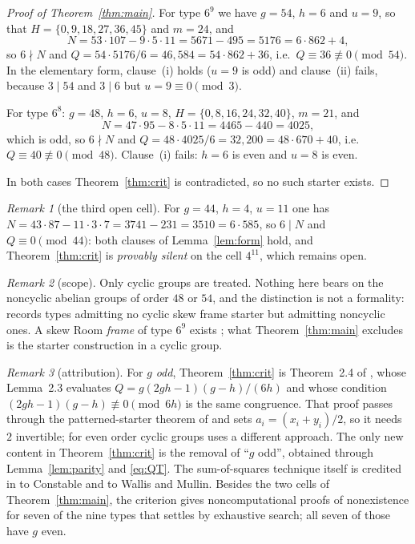\documentclass[11pt]{amsart}
\theoremstyle{remark}
\newtheorem*{remark}{Remark}
\begin{document}
\begin{proof}[Proof of Theorem~\ref{thm:main}]
For type $6^{9}$ we have $g=54$, $h=6$ and $u=9$, so that
$H=\{0,9,18,27,36,45\}$ and $m=24$, and
\[
  N=53\cdot107-9\cdot5\cdot11=5671-495=5176=6\cdot862+4,
\]
so $6\nmid N$ and $Q=54\cdot5176/6=46{,}584=54\cdot862+36$, i.e.\
$Q\equiv36\not\equiv0\pmod{54}$. In the elementary form, clause~(i) holds
($u=9$ is odd) and clause~(ii) fails, because $3\mid54$ and $3\mid 6$ but
$u=9\equiv0\pmod3$.

For type $6^{8}$: $g=48$, $h=6$, $u=8$, $H=\{0,8,16,24,32,40\}$, $m=21$, and
\[
  N=47\cdot95-8\cdot5\cdot11=4465-440=4025,
\]
which is odd, so $6\nmid N$ and $Q=48\cdot4025/6=32{,}200=48\cdot670+40$,
i.e.\ $Q\equiv40\not\equiv0\pmod{48}$. Clause~(i) fails: $h=6$ is even and
$u=8$ is even.

In both cases Theorem~\ref{thm:crit} is contradicted, so no such starter
exists.
\end{proof}

\begin{remark}[the third open cell]
For $g=44$, $h=4$, $u=11$ one has
$N=43\cdot87-11\cdot3\cdot7=3741-231=3510=6\cdot585$, so $6\mid N$ and
$Q\equiv0\pmod{44}$: both clauses of Lemma~\ref{lem:form} hold, and
Theorem~\ref{thm:crit} is \emph{provably silent} on the cell $4^{11}$, which
remains open.
\end{remark}

\begin{remark}[scope]
Only cyclic groups are treated. Nothing here bears on the noncyclic abelian
groups of order $48$ or $54$, and the distinction is not a formality:
\cite{Stinson23} records types admitting no cyclic skew frame starter but
admitting noncyclic ones. A skew Room \emph{frame} of type $6^{9}$ exists
\cite{ChenZhu96}; what Theorem~\ref{thm:main} excludes is the starter
construction in a cyclic group.
\end{remark}

\begin{remark}[attribution]
For $g$ \emph{odd}, Theorem~\ref{thm:crit} is Theorem~2.4 of
\cite{Stinson23}, whose Lemma~2.3 evaluates
$Q=g(2gh-1)(g-h)/(6h)$ and whose condition
$(2gh-1)(g-h)\not\equiv0\pmod{6h}$ is the same congruence. That proof passes
through the patterned-starter theorem of \cite{Stinson23} and sets
$a_i=(x_i+y_i)/2$, so it needs $2$ invertible; for even order cyclic groups
\cite{Stinson23} uses a different approach. The only new content in
Theorem~\ref{thm:crit} is the removal of ``$g$ odd'', obtained through
Lemma~\ref{lem:parity} and \eqref{eq:QT}. The sum-of-squares technique itself
is credited in \cite{Stinson23} to Constable and to Wallis and Mullin. Besides
the two cells of Theorem~\ref{thm:main}, the criterion gives noncomputational
proofs of nonexistence for seven of the nine types that \cite{Stinson23}
settles by exhaustive search; all seven of those have $g$ even.
\end{remark}
\end{document}
